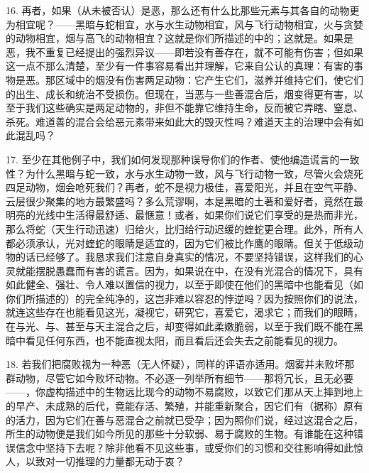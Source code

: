 16. 再者，如果（从未被否认）是恶，那么还有什么比那些元素与其各自的动物更为相宜呢？——黑暗与蛇相宜，水与水生动物相宜，风与飞行动物相宜，火与贪婪的动物相宜，烟与高飞的动物相宜？这就是你们所描述的中的；这就是。如果是恶，我不重复已经提出的强烈异议——即若没有善存在，就不可能有伤害；但如果这一点不那么清楚，至少有一件事容易看出并理解，它来自公认的真理：有害的事物是恶。那区域中的烟没有伤害两足动物：它产生它们，滋养并维持它们，使它们的出生、成长和统治不受损伤。但现在，当恶与一些善混合后，烟变得更有害，以至于我们这些确实是两足动物的，非但不能靠它维持生命，反而被它弄瞎、窒息、杀死。难道善的混合会给恶元素带来如此大的毁灭性吗？难道天主的治理中会有如此混乱吗？\par

17. 至少在其他例子中，我们如何发现那种误导你们的作者、使他编造谎言的一致性？为什么黑暗与蛇一致，水与水生动物一致，风与飞行动物一致，尽管火会烧死四足动物，烟会呛死我们？再者，蛇不是视力极佳，喜爱阳光，并且在空气平静、云层很少聚集的地方最繁盛吗？多么荒谬啊，本是黑暗的土著和爱好者，竟然在最明亮的光线中生活得最舒适、最惬意！或者，如果你们说它们享受的是热而非光，那么将蛇（天生行动迅速）归给火，比归给行动迟缓的蝰蛇更合理。此外，所有人都必须承认，光对蝰蛇的眼睛是适宜的，因为它们被比作鹰的眼睛。但关于低级动物的话已经够了。我恳求我们注意自身真实的情况，不要坚持错误，这样我们的心灵就能摆脱愚蠢而有害的谎言。因为，如果说在中，在没有光混合的情况下，具有如此健全、强壮、令人难以置信的视力，以至于即使在他们的黑暗中也能看见（如你们所描述的）的完全纯净的，这岂非难以容忍的悖逆吗？因为按照你们的说法，就连这些存在也能看见这光，凝视它，研究它，喜爱它，渴求它；而我们的眼睛，在与光、与、甚至与天主混合之后，却变得如此柔嫩脆弱，以至于我们既不能在黑暗中看见任何东西，也不能直视太阳，而且看后还会失去之前能看见的视力。\par

18. 若我们把腐败视为一种恶（无人怀疑），同样的评语亦适用。烟雾并未败坏那群动物，尽管它如今败坏动物。不必逐一列举所有细节——那将冗长，且无必要——，你虚构描述中的生物远比现今的动物不易腐败，以致它们那从天上摔到地上的早产、未成熟的后代，竟能存活、繁殖，并能重新聚合，因它们有（据称）原有的活力，因为它们在善与恶混合之前就已受孕；因为照你们说，经过这混合之后，所生的动物便是我们如今所见的那些十分软弱、易于腐败的生物。有谁能在这种错误信念中坚持下去呢？除非他看不见这些事，或受你们的习惯和交往影响得如此惊人，以致对一切推理的力量都无动于衷？\par

